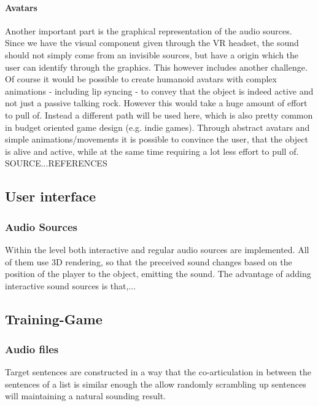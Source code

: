 \documentclass[a4paper,11pt]{article}%
\renewcommand{\\}{\vspace*{0.5\baselineskip} \newline}
\begin{document}
\paragraph{Avatars} Another important part is the graphical representation of the audio sources. Since we have the visual component given through the VR headset, the sound should not simply come from an invisible sources, but have a origin which the user can identify through the graphics. This however includes another challenge. Of course it would be possible to create humanoid avatars with complex animations - including lip syncing - to convey that the object is indeed active and not just a passive talking rock. However this would take a huge amount of effort to pull of. Instead a different path will be used here, which is also pretty common in budget oriented game design (e.g. indie games). Through abstract avatars and simple animations/movements it is possible to convince the user, that the object is alive and active, while at the same time requiring a lot less effort to pull of.
SOURCE...REFERENCES


\subsection{User interface}
\label{sec:approach_ui}



\subsubsection{Audio Sources}
Within the level both interactive and regular audio sources are implemented. All of them use 3D rendering, so that the preceived sound changes based on the position of the player to the object, emitting the sound. The advantage of adding interactive sound sources is that,...

\subsection{Training-Game}
\label{sec:training_game}


\subsubsection{Audio files}
Target sentences are constructed in a way that the co-articulation in between the sentences of a list is similar enough the allow randomly scrambling up sentences will maintaining a natural sounding result.
\end{document}
